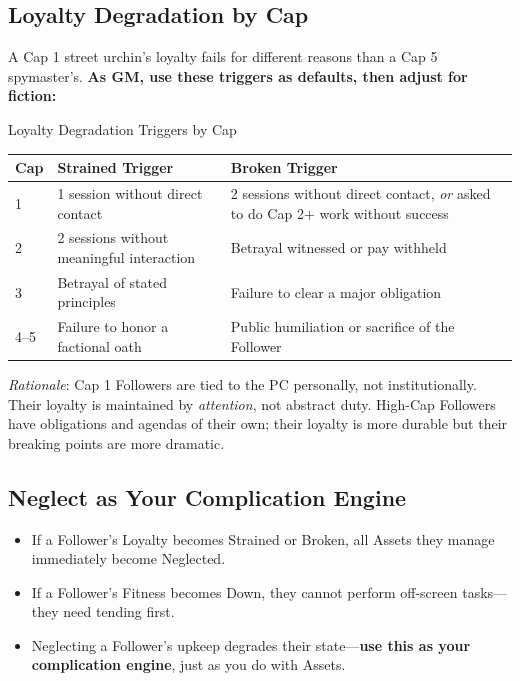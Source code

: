 \subsection{Loyalty Degradation by Cap}
A Cap 1 street urchin's loyalty fails for different reasons than a Cap 5 spymaster's. \textbf{As GM, use these triggers as defaults, then adjust for fiction:}

\begin{gmtable}{Loyalty Degradation Triggers by Cap}
\centering
\small
\begin{tabularx}{\linewidth}{@{}lXX@{}}
\toprule
\textbf{Cap} & \textbf{Strained Trigger} & \textbf{Broken Trigger} \\
\midrule
1 & 1 session without direct contact & 2 sessions without direct contact, \emph{or} asked to do Cap 2+ work without success \\
2 & 2 sessions without meaningful interaction & Betrayal witnessed or pay withheld \\
3 & Betrayal of stated principles & Failure to clear a major obligation \\
4--5 & Failure to honor a factional oath & Public humiliation or sacrifice of the Follower \\
\bottomrule
\end{tabularx}
\tcblower
\small\textit{Rationale}: Cap 1 Followers are tied to the PC personally, not institutionally. Their loyalty is maintained by \textit{attention}, not abstract duty. High-Cap Followers have obligations and agendas of their own; their loyalty is more durable but their breaking points are more dramatic.
\end{gmtable}

\subsection{Neglect as Your Complication Engine}
\begin{itemize}
  \item If a Follower's Loyalty becomes Strained or Broken, all Assets they manage immediately become Neglected.
  \item If a Follower's Fitness becomes Down, they cannot perform off-screen tasks---they need tending first.
  \item Neglecting a Follower's upkeep degrades their state---\textbf{use this as your complication engine}, just as you do with Assets.
\end{itemize}

